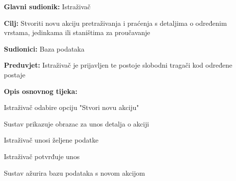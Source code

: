 					\noindent {}
					\begin{packed_item}
						
						\item \textbf{Glavni sudionik: }Istraživač
						\item  \textbf{Cilj:} Stvoriti novu akciju pretraživanja i praćenja s detaljima o određenim vrstama, jedinkama ili staništima za proučavanje 
						\item  \textbf{Sudionici:} Baza podataka
						\item  \textbf{Preduvjet:} Istraživač je prijavljen te postoje slobodni tragači kod određene postaje
						\item  \textbf{Opis osnovnog tijeka:}
						
						\item[] \begin{packed_enum}
							
							\item Istraživač odabire opciju "Stvori novu akciju" 
							\item Sustav prikazuje obrazac za unos detalja o akciji 
							\item Istraživač unosi željene podatke 
							\item Istraživač potvrđuje unos 
							\item Sustav ažurira bazu podataka s novom akcijom 
						\end{packed_enum}
					\end{packed_item}
					

